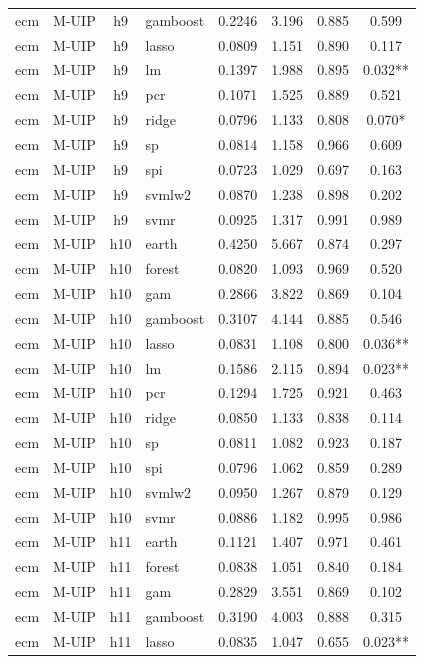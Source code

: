 \begin{ThreePartTable}
\begin{longtable}[t]{llclcccc}
ecm & M-UIP & h9 & gamboost & 0.2246 & 3.196 & 0.885 & 0.599\\
ecm & M-UIP & h9 & lasso & 0.0809 & 1.151 & 0.890 & 0.117\\
ecm & M-UIP & h9 & lm & 0.1397 & 1.988 & 0.895 & 0.032**\\
ecm & M-UIP & h9 & pcr & 0.1071 & 1.525 & 0.889 & 0.521\\
ecm & M-UIP & h9 & ridge & 0.0796 & 1.133 & 0.808 & 0.070*\\
ecm & M-UIP & h9 & sp & 0.0814 & 1.158 & 0.966 & 0.609\\
ecm & M-UIP & h9 & spi & 0.0723 & 1.029 & 0.697 & 0.163\\
ecm & M-UIP & h9 & svmlw2 & 0.0870 & 1.238 & 0.898 & 0.202\\
ecm & M-UIP & h9 & svmr & 0.0925 & 1.317 & 0.991 & 0.989\\
\addlinespace
ecm & M-UIP & h10 & earth & 0.4250 & 5.667 & 0.874 & 0.297\\
ecm & M-UIP & h10 & forest & 0.0820 & 1.093 & 0.969 & 0.520\\
ecm & M-UIP & h10 & gam & 0.2866 & 3.822 & 0.869 & 0.104\\
ecm & M-UIP & h10 & gamboost & 0.3107 & 4.144 & 0.885 & 0.546\\
ecm & M-UIP & h10 & lasso & 0.0831 & 1.108 & 0.800 & 0.036**\\
ecm & M-UIP & h10 & lm & 0.1586 & 2.115 & 0.894 & 0.023**\\
ecm & M-UIP & h10 & pcr & 0.1294 & 1.725 & 0.921 & 0.463\\
ecm & M-UIP & h10 & ridge & 0.0850 & 1.133 & 0.838 & 0.114\\
ecm & M-UIP & h10 & sp & 0.0811 & 1.082 & 0.923 & 0.187\\
ecm & M-UIP & h10 & spi & 0.0796 & 1.062 & 0.859 & 0.289\\
ecm & M-UIP & h10 & svmlw2 & 0.0950 & 1.267 & 0.879 & 0.129\\
ecm & M-UIP & h10 & svmr & 0.0886 & 1.182 & 0.995 & 0.986\\
\addlinespace
ecm & M-UIP & h11 & earth & 0.1121 & 1.407 & 0.971 & 0.461\\
ecm & M-UIP & h11 & forest & 0.0838 & 1.051 & 0.840 & 0.184\\
ecm & M-UIP & h11 & gam & 0.2829 & 3.551 & 0.869 & 0.102\\
ecm & M-UIP & h11 & gamboost & 0.3190 & 4.003 & 0.888 & 0.315\\
ecm & M-UIP & h11 & lasso & 0.0835 & 1.047 & 0.655 & 0.023**\\

\end{longtable}
\end{ThreePartTable}
